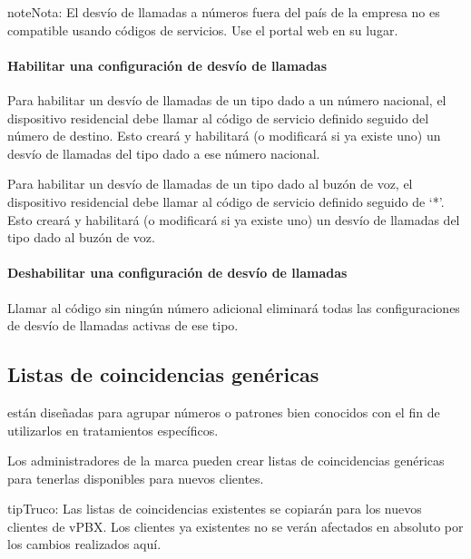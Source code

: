 \documentclass[letterpaper,10pt,spanish]{sphinxmanual}
\begin{document}
\begin{notice}{note}{Nota:}
El desvío de llamadas a números fuera del país de la empresa no es compatible usando códigos de servicios. Use el portal web en su lugar.
\end{notice}
\paragraph{Habilitar una configuración de desvío de llamadas}

Para habilitar un desvío de llamadas de un tipo dado a un número nacional, el dispositivo residencial debe llamar al código de servicio definido seguido del número de destino. Esto creará y habilitará (o modificará si ya existe uno) un desvío de llamadas del tipo dado a ese número nacional.

Para habilitar un desvío de llamadas de un tipo dado al buzón de voz, el dispositivo residencial debe llamar al código de servicio definido seguido de `*'. Esto creará y habilitará (o modificará si ya existe uno) un desvío de llamadas del tipo dado al buzón de voz.
\paragraph{Deshabilitar una configuración de desvío de llamadas}

Llamar al código sin ningún número adicional eliminará todas las configuraciones de desvío de llamadas activas de ese tipo.


\subsection{Listas de coincidencias genéricas}
\label{administration_portal/brand/settings/generic_match_lists:generic-match-lists}\label{administration_portal/brand/settings/generic_match_lists::doc}\label{administration_portal/brand/settings/generic_match_lists:brand-match-lists}
{\hyperref[administration_portal/client/vpbx/routing_tools/match_lists:id1]{}} están diseñadas para agrupar números o patrones bien conocidos con el fin de utilizarlos en tratamientos específicos.

Los administradores de la marca pueden crear listas de coincidencias genéricas para tenerlas disponibles para nuevos clientes.

\begin{notice}{tip}{Truco:}
Las listas de coincidencias existentes se copiarán para los nuevos clientes de vPBX. Los clientes ya existentes no se verán afectados en absoluto por los cambios realizados aquí.
\end{notice}
\end{document}

